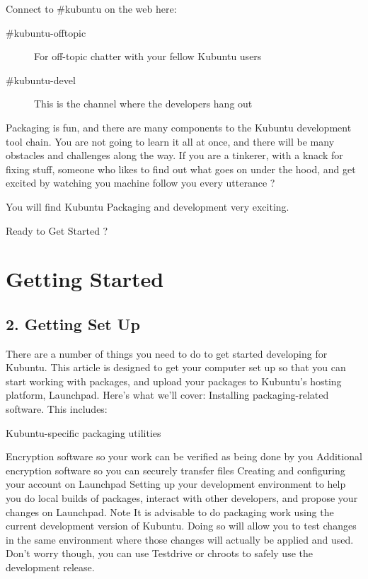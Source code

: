 \documentclass[letterpaper,10pt,english]{sphinxmanual}
\begin{document}
Connect to \#kubuntu on the web here: 
\begin{description}
\item[{\#kubuntu-offtopic}] \leavevmode
For off-topic chatter with your fellow Kubuntu users

\item[{\#kubuntu-devel}] \leavevmode
This is the channel where the developers hang out

\end{description}

Packaging is fun, and there are many components to the Kubuntu development tool chain. You are not going to learn it all at once, and there will be many obstacles and challenges along the way.
If you are a tinkerer, with a knack for fixing stuff, someone who likes to find out what goes on under the hood, and get excited by watching you machine follow you every utterance ?

You will find Kubuntu Packaging and development very exciting.

Ready to Get Started ?


\section{Getting Started}
\label{\detokenize{docs/packaging_guide/getting_started:getting-started}}\label{\detokenize{docs/packaging_guide/getting_started::doc}}

\subsection{2. Getting Set Up}
\label{\detokenize{docs/packaging_guide/getting_started:getting-set-up}}
There are a number of things you need to do to get started developing for Kubuntu. This article is designed to get your computer set up so that you can start working with packages, and upload your packages to Kubuntu’s hosting platform, Launchpad. Here’s what we’ll cover:
Installing packaging-related software. This includes:

Kubuntu-specific packaging utilities

Encryption software so your work can be verified as being done by you
Additional encryption software so you can securely transfer files
Creating and configuring your account on Launchpad
Setting up your development environment to help you do local builds of packages, interact with other developers, and propose your changes on Launchpad.
Note
It is advisable to do packaging work using the current development version of Kubuntu. Doing so will allow you to test changes in the same environment where those changes will actually be applied and used.
Don’t worry though, you can use Testdrive or chroots to safely use the development release.
\end{document}
